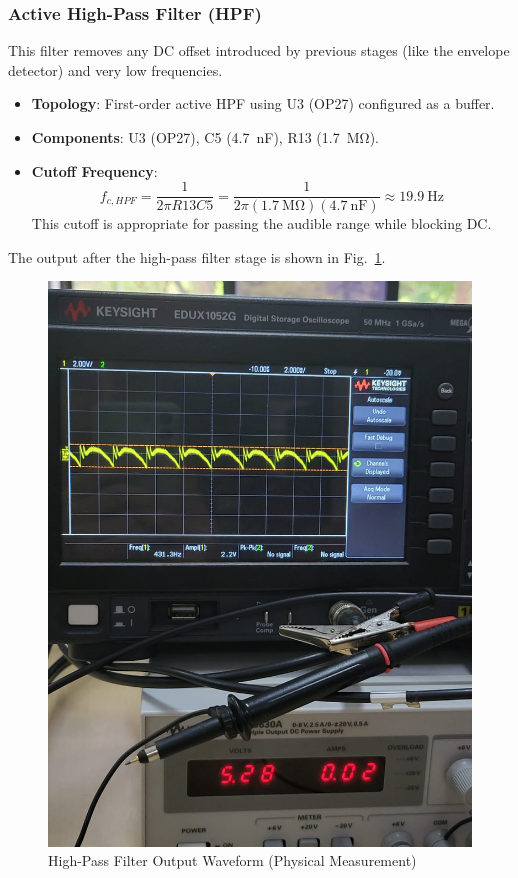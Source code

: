 \documentclass[conference]{IEEEtran}
\begin{document}
\subsubsection{Active High-Pass Filter (HPF)}
This filter removes any DC offset introduced by previous stages (like the envelope detector) and very low frequencies.
\begin{itemize}
    \item \textbf{Topology}: First-order active HPF using U3 (OP27) configured as a buffer.
    \item \textbf{Components}: U3 (OP27), C5 (\SI{4.7}{\nano\farad}), R13 (\SI{1.7}{\mega\ohm}).
    \item \textbf{Cutoff Frequency}:
        \begin{equation}
            f_{c, HPF} = \frac{1}{2\pi R13 C5} = \frac{1}{2\pi (\SI{1.7}{\mega\ohm})(\SI{4.7}{\nano\farad})} \approx \SI{19.9}{\hertz}
        \end{equation}
        This cutoff is appropriate for passing the audible range while blocking DC.
\end{itemize}
The output after the high-pass filter stage is shown in Fig.~\ref{fig:highpass}.

\begin{figure}[htbp]
    \centering
    \includegraphics[width=0.8\linewidth]{highpass.jpeg} %
    \caption{High-Pass Filter Output Waveform (Physical Measurement)}
    \label{fig:highpass}
\end{figure}
\end{document}
